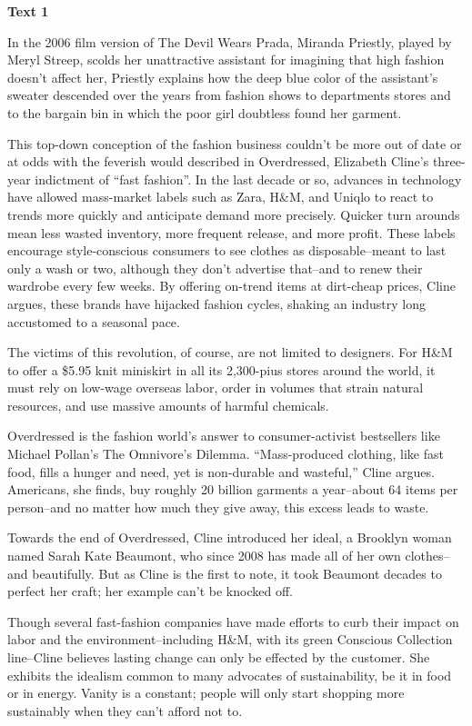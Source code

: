 \textbf{Text 1}

In the 2006 film version of The Devil Wears Prada, Miranda Priestly, played by Meryl Streep, scolds her unattractive assistant for imagining that high fashion doesn't affect her, Priestly explains how the deep blue color of the assistant's sweater descended over the years from fashion shows to departments stores and to the bargain bin in which the poor girl doubtless found her garment.

This top-down conception of the fashion business couldn't be more out of date or at odds with the feverish would described in Overdressed, Elizabeth Cline's three-year indictment of ``fast fashion''. In the last decade or so, advances in technology have allowed mass-market labels such as Zara, H\&M, and Uniqlo to react to trends more quickly and anticipate demand more precisely. Quicker turn arounds mean less wasted inventory, more frequent release, and more profit. These labels encourage style-conscious consumers to see clothes as disposable--meant to last only a wash or two, although they don't advertise that--and to renew their wardrobe every few weeks. By offering on-trend items at dirt-cheap prices, Cline argues, these brands have hijacked fashion cycles, shaking an industry long accustomed to a seasonal pace.

The victims of this revolution, of course, are not limited to designers. For H\&M to offer a \$5.95 knit miniskirt in all its 2,300-pius stores around the world, it must rely on low-wage overseas labor, order in volumes that strain natural resources, and use massive amounts of harmful chemicals.

Overdressed is the fashion world's answer to consumer-activist bestsellers like Michael Pollan's The Omnivore’s Dilemma. ``Mass-produced clothing, like fast food, fills a hunger and need, yet is non-durable and wasteful,'' Cline argues. Americans, she finds, buy roughly 20 billion garments a year--about 64 items per person--and no matter how much they give away, this excess leads to waste.

Towards the end of Overdressed, Cline introduced her ideal, a Brooklyn woman named Sarah Kate Beaumont, who since 2008 has made all of her own clothes--and beautifully. But as Cline is the first to note, it took Beaumont decades to perfect her craft; her example can't be knocked off.

Though several fast-fashion companies have made efforts to curb their impact on labor and the environment--including H\&M, with its green Conscious Collection line--Cline believes lasting change can only be effected by the customer. She exhibits the idealism common to many advocates of sustainability, be it in food or in energy. Vanity is a constant; people will only start shopping more sustainably when they can't afford not to.

